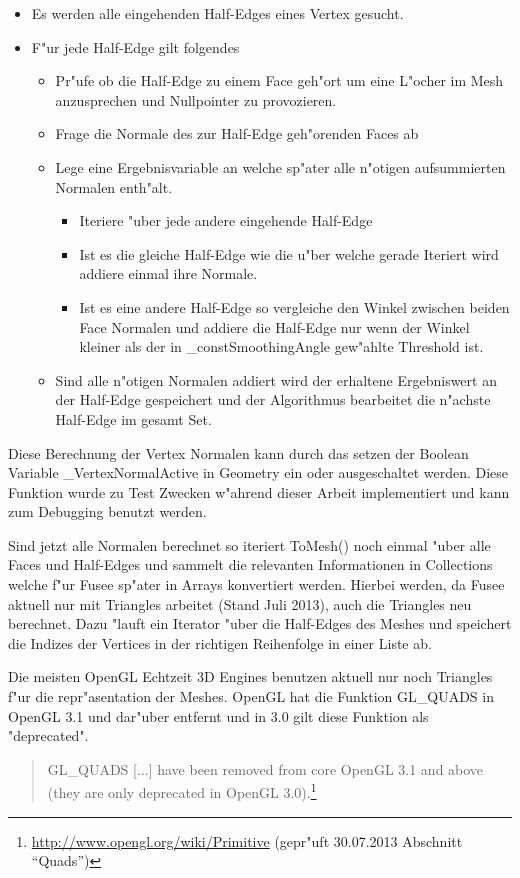 \documentclass[pagesize, paper=a4, fontsize=12pt,titlepage=true, headings=small, headnosepline, abstractoff, liststotoc, nochapterprefix, plainheadsepline]{scrreprt}
\begin{document}
\begin{itemize}
\item Es werden alle eingehenden Half-Edges eines Vertex gesucht.
\item F"ur jede Half-Edge gilt folgendes
	\begin{itemize}
	\item Pr"ufe ob die Half-Edge zu einem Face geh"ort um eine L"ocher im Mesh anzusprechen und Nullpointer zu provozieren.
	\item Frage die Normale des zur Half-Edge geh"orenden Faces ab
	\item Lege eine Ergebnisvariable an welche sp"ater alle n"otigen aufsummierten Normalen enth"alt.
		\begin{itemize}
		\item Iteriere "uber jede andere eingehende Half-Edge
		\item Ist es die gleiche Half-Edge wie die u"ber welche gerade Iteriert wird addiere einmal ihre Normale.
		\item Ist es eine andere Half-Edge so vergleiche den Winkel zwischen beiden Face Normalen und addiere die Half-Edge nur wenn der Winkel kleiner als der in \_constSmoothingAngle gew"ahlte Threshold ist.
		\end{itemize}
	\item Sind alle n"otigen Normalen addiert wird der erhaltene Ergebniswert an der Half-Edge gespeichert und der Algorithmus bearbeitet die n"achste Half-Edge im gesamt Set.
	\end{itemize}
\end{itemize}

Diese Berechnung der Vertex Normalen kann durch das setzen der Boolean Variable \_VertexNormalActive in Geometry ein oder ausgeschaltet werden. Diese Funktion wurde zu Test Zwecken w"ahrend dieser Arbeit implementiert und kann zum Debugging benutzt werden.
\newline

Sind jetzt alle Normalen berechnet so iteriert ToMesh() noch einmal "uber alle Faces und Half-Edges und sammelt die relevanten Informationen in Collections welche f"ur Fusee sp"ater in Arrays konvertiert werden. Hierbei werden, da Fusee aktuell nur mit Triangles arbeitet (Stand Juli 2013), auch die Triangles neu berechnet. Dazu "lauft ein Iterator "uber die Half-Edges des Meshes und speichert die Indizes der Vertices in der richtigen Reihenfolge in einer Liste ab.

Die meisten OpenGL Echtzeit 3D Engines benutzen aktuell nur noch Triangles f"ur die repr"asentation der Meshes. OpenGL hat die Funktion GL\_QUADS in OpenGL 3.1 und dar"uber entfernt und in 3.0 gilt diese Funktion als "deprecated".
\begin{quote}GL\_QUADS [...] have been removed from core OpenGL 3.1 and above (they are only deprecated in OpenGL 3.0).\footnote{\url{http://www.opengl.org/wiki/Primitive} (gepr"uft 30.07.2013 Abschnitt "`Quads"')}
\end{quote}
\end{document}
